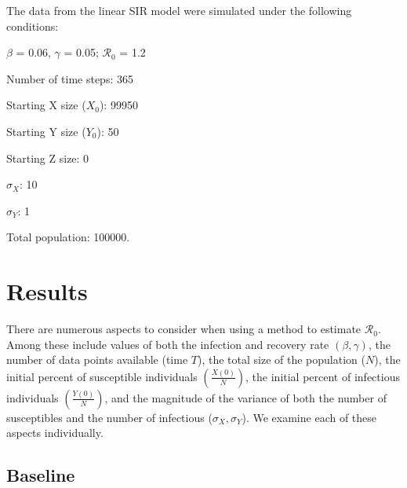 \documentclass[12pt]{article}
\newcommand{\rr}{\ensuremath{\mathcal{R}_0}}
\begin{document}
The data from the linear SIR model were simulated under the following conditions:

\begin{center}
	
	$\beta$ = 0.06, $\gamma$ = 0.05; $\rr$ = 1.2
	
	Number of time steps: 365
	
	Starting X size ($X_0$): 99950
	
	Starting Y size ($Y_0$): 50
	
	Starting Z size: 0 
	
	$\sigma_X$: 10
	
	$\sigma_Y$: 1
	
	Total population: 100000.
	
\end{center}

\section{Results}\label{sec:results}
There are numerous aspects to consider when using a method to estimate $\rr$.  Among these include values of both the infection and recovery rate $(\beta, \gamma)$, the number of data points available (time $T$), the total size of the population ($N$), the initial percent of susceptible individuals $\left (\frac{X(0)}{N}\right)$, the initial percent of infectious individuals $\left (\frac{Y(0)}{N}\right )$, and  the magnitude of the variance of both the number of susceptibles and the number of infectious ($\sigma_X, \sigma_Y$).  We examine each of these aspects individually.

\subsection{Baseline}\label{sec:res-base}
\end{document}
